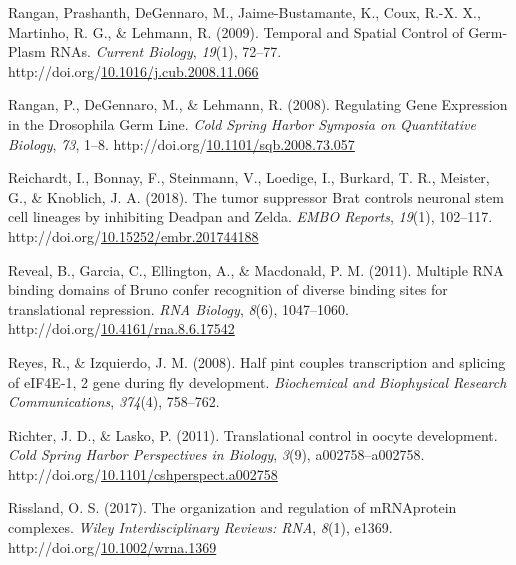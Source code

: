 \documentclass[12pt,oneside]{reedthesis}
\newlength{\cslhangindent}
\newenvironment{CSLReferences}[2] %
 {%
  \setlength{\parindent}{0pt}
  \ifodd #1 \everypar{\setlength{\hangindent}{\cslhangindent}}\ignorespaces\fi
  \ifnum #2 > 0
  \setlength{\parskip}{#2\baselineskip}
  \fi
 }%
 {}
\begin{document}
\begin{CSLReferences}{1}{0}
\leavevmode{}%
Rangan, Prashanth, DeGennaro, M., Jaime-Bustamante, K., Coux, R.-X. X., Martinho, R. G., \& Lehmann, R. (2009). Temporal and {Spatial Control} of {Germ}-{Plasm RNAs}. \emph{Current Biology}, \emph{19}(1), 72--77. http://doi.org/\href{https://doi.org/10.1016/j.cub.2008.11.066}{10.1016/j.cub.2008.11.066}

\leavevmode{}%
Rangan, P., DeGennaro, M., \& Lehmann, R. (2008). Regulating {Gene Expression} in the {Drosophila Germ Line}. \emph{Cold Spring Harbor Symposia on Quantitative Biology}, \emph{73}, 1--8. http://doi.org/\href{https://doi.org/10.1101/sqb.2008.73.057}{10.1101/sqb.2008.73.057}

\leavevmode{}%
Reichardt, I., Bonnay, F., Steinmann, V., Loedige, I., Burkard, T. R., Meister, G., \& Knoblich, J. A. (2018). The tumor suppressor {Brat} controls neuronal stem cell lineages by inhibiting {Deadpan} and {Zelda}. \emph{EMBO Reports}, \emph{19}(1), 102--117. http://doi.org/\href{https://doi.org/10.15252/embr.201744188}{10.15252/embr.201744188}

\leavevmode{}%
Reveal, B., Garcia, C., Ellington, A., \& Macdonald, P. M. (2011). Multiple {RNA} binding domains of {Bruno} confer recognition of diverse binding sites for translational repression. \emph{RNA Biology}, \emph{8}(6), 1047--1060. http://doi.org/\href{https://doi.org/10.4161/rna.8.6.17542}{10.4161/rna.8.6.17542}

\leavevmode{}%
Reyes, R., \& Izquierdo, J. M. (2008). Half pint couples transcription and splicing of {eIF4E}-1, 2 gene during fly development. \emph{Biochemical and Biophysical Research Communications}, \emph{374}(4), 758--762.

\leavevmode{}%
Richter, J. D., \& Lasko, P. (2011). Translational control in oocyte development. \emph{Cold Spring Harbor Perspectives in Biology}, \emph{3}(9), a002758--a002758. http://doi.org/\href{https://doi.org/10.1101/cshperspect.a002758}{10.1101/cshperspect.a002758}

\leavevmode{}%
Rissland, O. S. (2017). The organization and regulation of {mRNA}\textendash protein complexes. \emph{Wiley Interdisciplinary Reviews: RNA}, \emph{8}(1), e1369. http://doi.org/\href{https://doi.org/10.1002/wrna.1369}{10.1002/wrna.1369}


\end{CSLReferences}
\end{document}
